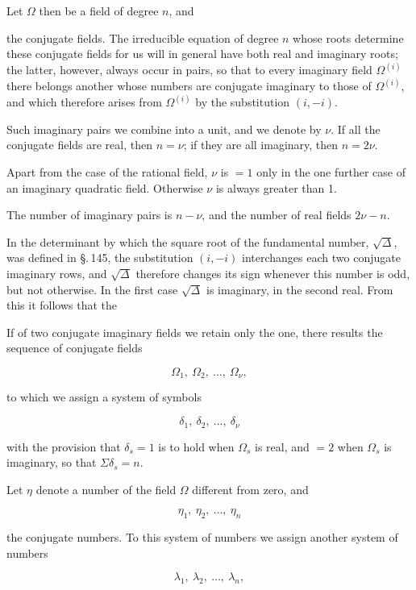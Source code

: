 Let $\Omega$ then be a field of degree $n$, and


the conjugate fields. The irreducible equation of degree $n$ whose roots determine these conjugate fields for us will in general have both real and imaginary roots; the latter, however, always occur in pairs, so that to every imaginary field $\Omega^{(i)}$ there belongs another whose numbers are conjugate imaginary to those of $\Omega^{(i)}$, and which therefore arises from $\Omega^{(i)}$ by the substitution $(i, -i)$.

Such imaginary pairs we combine into a unit, and we denote  by $\nu$. If all the conjugate fields are real, then $n = \nu$; if they are all imaginary, then $n = 2\nu$.

Apart from the case of the rational field, $\nu$ is $= 1$ only in the one further case of an imaginary quadratic field. Otherwise $\nu$ is always greater than 1.

The number of imaginary pairs is $n - \nu$, and the number of real fields $2\nu - n$.

In the determinant by which the square root of the fundamental number, $\sqrt{\Delta}$, was defined in \S.\,145, the substitution $(i, -i)$ interchanges each two conjugate imaginary rows, and $\sqrt{\Delta}$ therefore changes its sign whenever this number is odd, but not otherwise. In the first case $\sqrt{\Delta}$ is imaginary, in the second real. From this it follows that the 

If of two conjugate imaginary fields we retain only the one, there results the sequence of conjugate fields

\[ \Omega_1,\ \Omega_2,\ \ldots,\ \Omega_\nu, \]

to which we assign a system of symbols

\[ \delta_1,\ \delta_2,\ \ldots,\ \delta_\nu \]

with the provision that $\delta_s = 1$ is to hold when $\Omega_s$ is real, and $= 2$ when $\Omega_s$ is imaginary, so that $\Sigma \delta_s = n$.

Let $\eta$ denote a number of the field $\Omega$ different from zero, and

\[ \eta_1,\ \eta_2,\ \ldots,\ \eta_n \]

the conjugate numbers. To this system of numbers we assign another system of numbers

\[ \lambda_1,\ \lambda_2,\ \ldots,\ \lambda_n, \]

